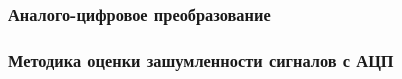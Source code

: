 \subsubsection{ Аналого-цифровое преобразование }

\subsubsection{ Методика оценки зашумленности сигналов с АЦП }

\endinput


